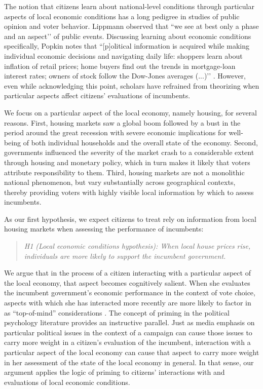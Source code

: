 \documentclass[12pt,a4paper]{article}
\begin{document}
	The notion that citizens learn about national-level conditions through particular aspects of local economic conditions has a long pedigree in studies of public opinion and voter behavior. Lippmann \citeyearpar[][p. 79]{lippmann1946public} observed that ``we see at best only a phase and an aspect’’ of public events. Discussing learning about economic conditions specifically, Popkin \citeyearpar[][p. 24]{popkin1994reasoning} notes that ``[p]olitical information is acquired while making individual economic decisions and navigating daily life: shoppers learn about inflation of retail prices; home buyers find out the trends in mortgage-loan interest rates; owners of stock follow the Dow-Jones averages (...)’’ \cite[see also][p. 5]{fiorina1981retrospective}. However, even while acknowledging this point, scholars have refrained from theorizing when particular aspects affect citizens’ evaluations of incumbents. 
		
	 We focus on a particular aspect of the local economy, namely housing, for several reasons. First, housing markets saw a global boom followed by a bust in the period around the great recession with severe economic implications for well-being of both individual households and the overall state of the economy. Second, governments influenced the severity of the market crash to a considerable extent through housing and monetary policy, which in turn makes it likely that voters attribute responsibility to them. Third, housing markets are not a monolithic national phenomenon, but vary substantially across geographical contexts, thereby providing voters with highly visible local information by which to assess incumbents. 

	As our first hypothesis, we expect citizens to treat rely on information from local housing markets when assessing the performance of incumbents: 

	\newcommand{\hone}{the local economic conditions hypothesis}

	\begin{quote}
		\textit{H1 (Local economic conditions hypothesis): When local house prices rise, individuals are more likely to support the incumbent government.}
	\end{quote}
	
	We argue that in the process of a citizen interacting with a particular aspect of the local economy, that aspect becomes cognitively salient. When she evaluates the incumbent government’s economic performance in the context of vote choice, aspects with which she has interacted more recently are more likely to factor in as “top-of-mind” considerations \citep{zaller1992nature}. The concept of priming in the political psychology literature provides an instructive parallel. Just as media emphasis on particular political issues in the context of a campaign can cause those issues to carry more weight in a citizen’s evaluation of the incumbent, interaction with a particular aspect of the local economy can cause that aspect to carry more weight in her assessment of the state of the local economy in general. In that sense, our argument applies the logic of priming to citizens’ interactions with and evaluations of local economic conditions. 
	
\end{document}
